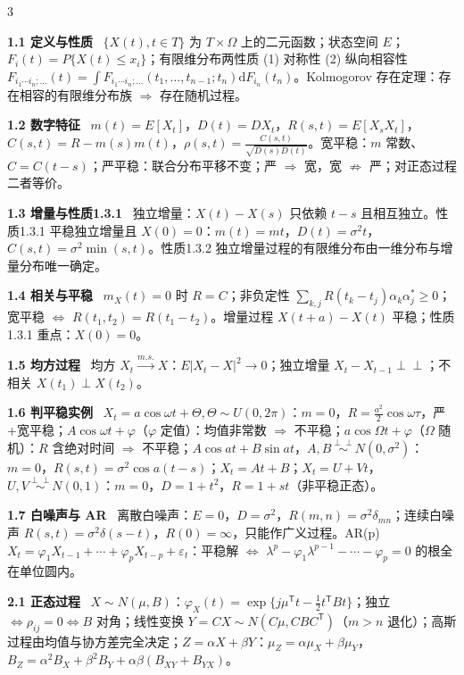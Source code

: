 \documentclass[UTF8,a4paper]{ctexart}
\newcommand{\Sec}[1]{\par\vspace{1.4pt}{\bfseries\color{blue!65!black}\small #1}\par\vspace{0.4pt}}
\newcommand{\T}[1]{{\bfseries #1}\ }
\newcommand{\Hi}[1]{\textcolor{red!70!black}{#1}}
\newcommand{\dd}{\mathrm{d}}
\newcommand{\ind}{\perp\!\!\!\perp}
\begin{document}
\begin{multicols}{3}
\Sec{第1章 随机过程基本概念}

\T{1.1 定义与性质} $\{X(t),t\in T\}$ 为 $T\times\Omega$ 上的二元函数；状态空间 $E$；$F_i(t)=P\{X(t)\le x_i\}$；\Hi{有限维分布两性质} (1) 对称性 (2) 纵向相容性 $F_{i_1\cdots i_n;\ldots}(t)=\int F_{i_1\cdots i_n;\ldots}(t_1,\ldots,t_{n-1};t_n)\dd F_{i_n}(t_n)$。\Hi{Kolmogorov 存在定理}：存在相容的有限维分布族 $\Rightarrow$ 存在随机过程。

\T{1.2 数字特征} $m(t)=E[X_t]$，$D(t)=DX_t$，$R(s,t)=E[X_sX_t]$，$C(s,t)=R-m(s)m(t)$，$\rho(s,t)=\frac{C(s,t)}{\sqrt{D(s)D(t)}}$。宽平稳：$m$ 常数、$C=C(t-s)$；严平稳：联合分布平移不变；\Hi{严 $\Rightarrow$ 宽}，宽 $\nRightarrow$ 严；对正态过程二者等价。

\T{1.3 增量与性质1.3.1} 独立增量：$X(t)-X(s)$ 只依赖 $t-s$ 且相互独立。\Hi{性质1.3.1} 平稳独立增量且 $X(0)=0$：$m(t)=mt$，$D(t)=\sigma^2t$，$C(s,t)=\sigma^2\min(s,t)$。\Hi{性质1.3.2} 独立增量过程的有限维分布由一维分布与增量分布唯一确定。

\T{1.4 相关与平稳} $m_X(t)=0$ 时 $R=C$；非负定性 $\sum_{k,j}R(t_k-t_j)\alpha_k\alpha_j^*\ge0$；宽平稳 $\iff$ $R(t_1,t_2)=R(t_1-t_2)$。增量过程 $X(t+a)-X(t)$ 平稳；\Hi{性质1.3.1 重点：$X(0)=0$}。

\T{1.5 均方过程} 均方 $X_t\xrightarrow{m.s.}X$：$E|X_t-X|^2\to0$；独立增量 $X_t-X_{t-1}\ind$；不相关 $X(t_1)\perp X(t_2)$。

\T{1.6 判平稳实例} $X_t=a\cos\omega t+\Theta,\Theta\sim U(0,2\pi)$：$m=0$，$R=\frac{a^2}2\cos\omega\tau$，严+宽平稳；$A\cos\omega t+\varphi$（$\varphi$ 定值）：均值非常数 $\Rightarrow$ 不平稳；$a\cos\Omega t+\varphi$（$\Omega$ 随机）：$R$ 含绝对时间 $\Rightarrow$ 不平稳；$A\cos at+B\sin at$，$A,B\overset{\ind}{\sim}N(0,\sigma^2)$：$m=0$，$R(s,t)=\sigma^2\cos a(t-s)$；$X_t=At+B$；$X_t=U+Vt$，$U,V\overset{\ind}{\sim}N(0,1)$：$m=0$，$D=1+t^2$，$R=1+st$（非平稳正态）。

\T{1.7 白噪声与 AR} 离散白噪声：$E=0$，$D=\sigma^2$，$R(m,n)=\sigma^2\delta_{mn}$；连续白噪声 $R(s,t)=\sigma^2\delta(s-t)$，$R(0)=\infty$，只能作广义过程。\Hi{AR(p)} $X_t=\varphi_1X_{t-1}+\cdots+\varphi_pX_{t-p}+\varepsilon_t$：平稳解 $\iff$ $\lambda^p-\varphi_1\lambda^{p-1}-\cdots-\varphi_p=0$ 的根全在单位圆内。

\Sec{第2章 几种重要随机过程}

\T{2.1 正态过程} $X\sim N(\mu,B)$：$\varphi_X(t)=\exp\{j\mu^{\mathsf T}t-\tfrac12t^{\mathsf T}Bt\}$；\Hi{独立 $\iff\rho_{ij}=0\iff B$ 对角}；\Hi{线性变换 $Y=CX\sim N(C\mu,CBC^{\mathsf T})$}（$m>n$ 退化）；\Hi{高斯过程由均值与协方差完全决定}；$Z=\alpha X+\beta Y$：$\mu_Z=\alpha\mu_X+\beta\mu_Y$，$B_Z=\alpha^2B_X+\beta^2B_Y+\alpha\beta(B_{XY}+B_{YX})$。


\end{multicols}
\end{document}
